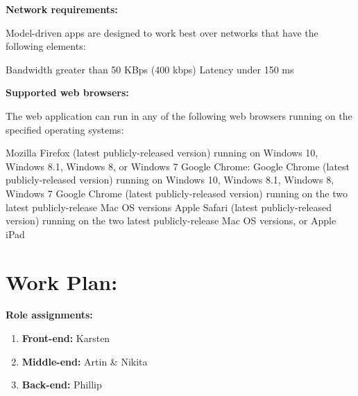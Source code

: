\documentclass{article}
\begin{document}
\begin{flushleft}
\textbf{Network requirements:}\\ 

Model-driven apps are designed to work best over networks that have the following elements:
\end{flushleft}
\begin{outline}
    \1 Bandwidth greater than 50 KBps (400 kbps)
    \1 Latency under 150 ms
\end{outline}

\begin{flushleft}
\textbf{Supported web browsers:}\\ 

The web application can run in any of the following web browsers running on the specified operating systems:
\end{flushleft}
\begin{outline}
    \1 Mozilla Firefox (latest publicly-released version) running on Windows 10, Windows 8.1, Windows 8, or Windows 7
    \1 Google Chrome:
        \2 Google Chrome (latest publicly-released version) running on Windows 10, Windows 8.1, Windows 8, Windows 7
        \2 Google Chrome (latest publicly-released version) running on the two latest publicly-release Mac OS versions
    \1 Apple Safari (latest publicly-released version) running on the two latest publicly-release Mac OS versions, or Apple iPad
\end{outline}
\newpage

\section*{Work Plan:}

\textbf{Role assignments:}
\begin{enumerate}
    \item \textbf{Front-end:} Karsten
    \item \textbf{Middle-end:} Artin \& Nikita
    \item \textbf{Back-end:} Phillip
\end{enumerate}
\end{document}
